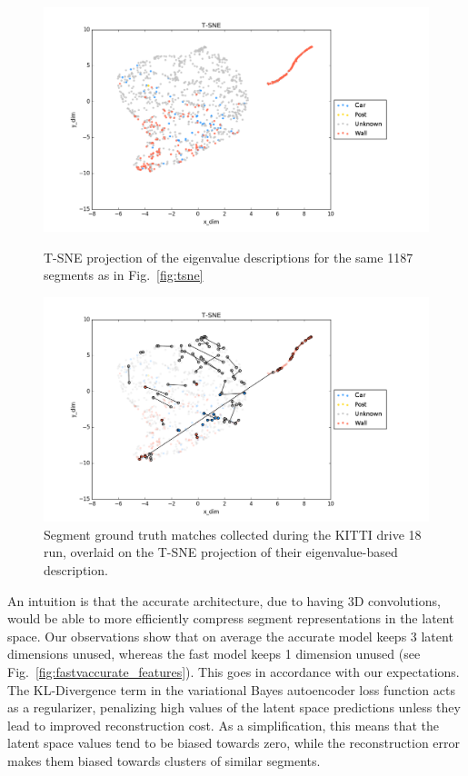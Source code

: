 \begin{figure}[p]
  \centering
  \includegraphics[width=5.2in]{images/t-sne_eig.png}
\caption{T-SNE projection of the eigenvalue descriptions for the same 1187 segments as in Fig.~\ref{fig:tsne}}
  \label{fig:tsne_eig}
  \hfill
  \includegraphics[width=5.2in]{images/t-sne_matches_eig.png}
\caption{Segment ground truth matches collected during the KITTI drive 18 run, overlaid on the T-SNE projection of their eigenvalue-based description.}
  \label{fig:tsne_matches_eig}
\end{figure}


An intuition is that the accurate architecture, due to having 3D convolutions, would be able to more efficiently compress segment representations in the latent space. Our observations show that on average the accurate model keeps 3 latent dimensions unused, whereas the fast model keeps 1 dimension unused (see Fig.~\ref{fig:fastvaccurate_features}). This goes in accordance with our expectations.\\

The KL-Divergence term in the variational Bayes autoencoder loss function acts as a regularizer, penalizing high values of the latent space predictions unless they lead to improved reconstruction cost. As a simplification, this means that the latent space values tend to be biased towards zero, while the reconstruction error makes them biased towards clusters of similar segments.\\

